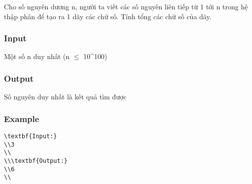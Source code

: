 



   Cho số nguyên dương n, người ta viết các số nguyên liên tiếp từ 1 tới n trong hệ thập phân để tạo ra 1 dãy các chữ số. Tính tổng các chữ số của dãy.  

\subsubsection{   Input  }

   Một số n duy nhất (n  $\le$  10\textasciicircum100)  

\subsubsection{   Output  }

   Số nguyên duy nhất là kết quả tìm được  

\subsubsection{   Example  }
\begin{verbatim}
\textbf{Input:}
\\3
\\
\\\textbf{Output:}
\\6
\\\end{verbatim}
